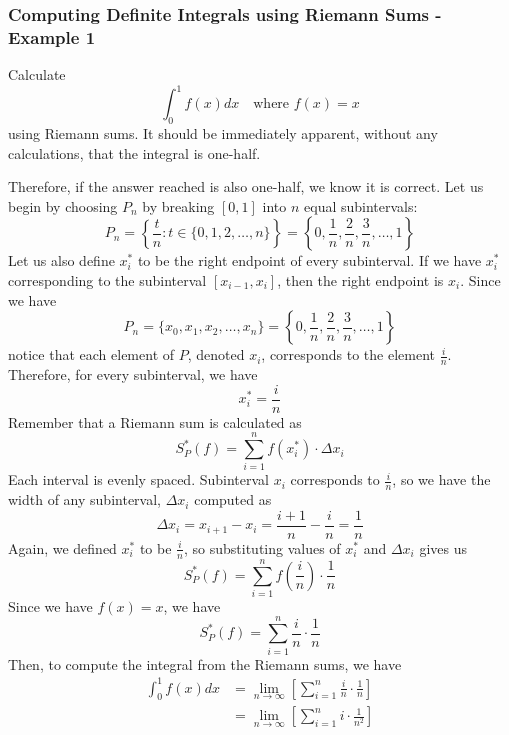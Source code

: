 \documentclass[10pt]{article}
\begin{document}
\subsubsection{Computing Definite Integrals using Riemann Sums - Example 1}
Calculate
$$
    \int_0^1 f(x) dx\quad\text{where $f(x)=x$}
$$
using Riemann sums.
It should be immediately apparent, without any calculations, that the integral is one-half.
\begin{center}
\end{center}
Therefore, if the answer reached is also one-half, we know it is correct. Let us begin by choosing $P_n$ by breaking $[0,1]$ into $n$ equal subintervals:
$$
    P_n=\left\{\frac{t}{n}:t\in\{0,1,2,\dots,n\}\right\}=\left\{0,\frac{1}{n},\frac{2}{n},\frac{3}{n},\dots,1\right\}
$$
Let us also define $x_i^*$ to be the right endpoint of every subinterval. If we have $x_i^*$ corresponding to the subinterval $[x_{i-1},x_i]$, then the right endpoint is $x_i$. Since we have
$$
    P_n=\{x_0,x_1,x_2,\dots,x_n\}=\left\{0,\frac{1}{n},\frac{2}{n},\frac{3}{n},\dots,1\right\}
$$
notice that each element of $P$, denoted $x_i$, corresponds to the element $\frac{i}{n}$. Therefore, for every subinterval, we have
$$
    x_i^*=\frac{i}{n}
$$
Remember that a Riemann sum is calculated as
$$
    S_P^*(f)=\sum_{i=1}^nf(x_i^*)\cdot\Delta x_i
$$
Each interval is evenly spaced. Subinterval $x_i$ corresponds to $\frac{i}{n}$, so we have the width of any subinterval, $\Delta x_i$ computed as
$$
    \Delta x_i=x_{i+1}-x_i=\frac{i+1}{n}-\frac{i}{n}=\frac{1}{n}
$$
Again, we defined $x_i^*$ to be $\frac{i}{n}$, so substituting values of $x_i^*$ and $\Delta x_i$ gives us
$$
    S_P^*(f)=\sum_{i=1}^nf\left(\frac{i}{n}\right)\cdot\frac{1}{n}
$$
Since we have $f(x)=x$, we have
$$
    S_P^*(f)=\sum_{i=1}^n\frac{i}{n}\cdot\frac{1}{n}
$$
Then, to compute the integral from the Riemann sums, we have
$$
    \begin{aligned}
        \int_0^1 f(x) dx&=\lim_{n\to\infty}\left[\sum_{i=1}^n\frac{i}{n}\cdot\frac{1}{n}\right] \\
        &=\lim_{n\to\infty}\left[\sum_{i=1}^n i\cdot \frac{1}{n^2}\right]
    \end{aligned}
$$
\end{document}
